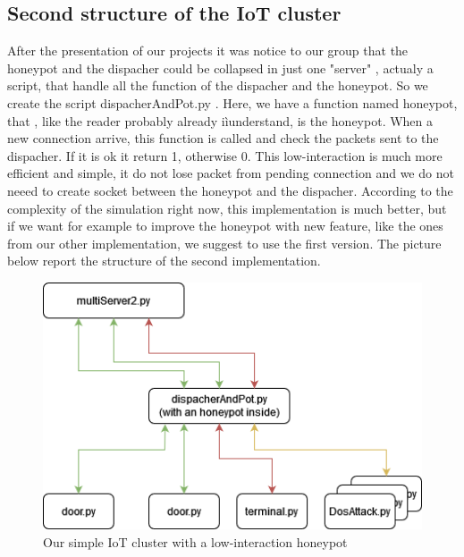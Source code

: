 \subsection{ Second structure of the IoT cluster}
After the presentation of our projects it was notice to our group that the honeypot and the dispacher could be collapsed in just one "server" , actualy a script, that handle all the function of the dispacher and the honeypot.  So we create the script dispacherAndPot.py . Here, we have a function named honeypot, that , like the reader probably already iìunderstand, is the honeypot. When a new connection arrive, this function is called and check the packets sent to the dispacher. If it is ok it return 1, otherwise 0. This low-interaction is much more efficient and simple, it do not lose packet from pending connection and we do not neeed to create socket between the honeypot and the dispacher. According to the complexity of the simulation right now, this implementation is much better, but if we want for example to improve the honeypot with new feature, like the ones from our other implementation, we suggest to use the first version. The picture below report the structure of the second implementation. 
\begin{figure}[h!]
  \centering
  \includegraphics[width = 12cm]{images/lowInterationHoneypot.drawio.png}
  \caption{Our simple IoT cluster with a low-interaction honeypot}
  \label{fig:DosImpl2}
\end{figure}
\FloatBarrier
\noindent











